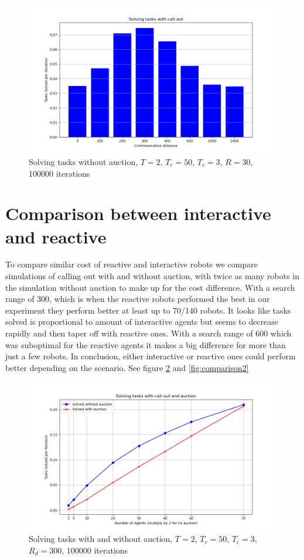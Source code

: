 \documentclass{article}
\begin{document}
\begin{figure}
	\includegraphics[width=\textwidth]{search_ranges.png}
	\caption{Solving tasks without auction, $T=2$, $T_r=50$, $T_c=3$, $R=30$, 100000 iterations}
	\label{fig:search}
\end{figure}


\section{Comparison between interactive and reactive}
To compare similar cost of reactive and interactive robots we compare simulations of calling out with and without auction, with twice as many robots in the simulation without auction to make up for the cost difference. With a search range of 300, which is when the reactive robots performed the best in our experiment they perform better at least up to 70/140 robots. It looks like tasks solved is proportional to amount of interactive agents but seems to decrease rapidly and then taper off with reactive ones. With a search range of 600 which was suboptimal for the reactive agents it makes a big difference for more than just a few robots. In conclusion, either interactive or reactive ones could perform better depending on the scenario. See figure \ref{fig:comparison} and \ref{fig:comparison2}

\begin{figure}
	\includegraphics[width=\textwidth]{search_ranges_comparison.png}
	\caption{Solving tasks with and without auction, $T=2$, $T_r=50$, $T_c=3$, $R_d = 300$, 100000 iterations}
	\label{fig:comparison}
\end{figure}
\end{document}
